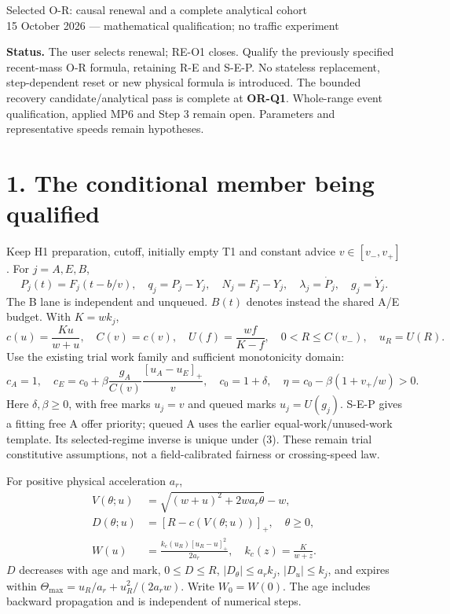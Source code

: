 \documentclass[11pt,a4paper]{article}
\newcommand{\pos}[1]{[#1]_+}
\begin{document}
\begin{center}
{\Large Selected O-R: causal renewal and a complete analytical cohort}\\[4pt]
15 October 2026 --- mathematical qualification; no traffic experiment
\end{center}

\textbf{Status.} The user selects renewal; RE-O1 closes. Qualify the
previously specified recent-mass O-R formula, retaining R-E and S-E-P.
No stateless replacement, step-dependent reset or new physical formula is
introduced. The bounded recovery candidate/analytical pass is complete at
\textbf{OR-Q1}. Whole-range event qualification, applied MP6 and Step 3
remain open. Parameters and representative speeds remain hypotheses.

\section*{1. The conditional member being qualified}

Keep H1 preparation, cutoff, initially empty T1 and constant advice
$v\in[v_-,v_+]$. For $j=A,E,B$,
\begin{equation}
 P_j(t)=F_j(t-b/v),\quad q_j=P_j-Y_j,\quad N_j=F_j-Y_j,
 \quad \lambda_j=\dot P_j,\quad g_j=\dot Y_j. \tag{1}
\end{equation}
The B lane is independent and unqueued. $B(t)$ denotes instead the
shared A/E budget. With $K=wk_j$,
\begin{equation}
 c(u)=\frac{Ku}{w+u},\quad C(v)=c(v),\quad U(f)=\frac{wf}{K-f},
 \quad 0<R\leq C(v_-),\quad u_R=U(R). \tag{2}
\end{equation}
Use the existing trial work family and sufficient monotonicity domain:
\begin{equation}
 c_A=1,\quad c_E=c_0+\beta\frac{g_A}{C(v)}\frac{\pos{u_A-u_E}}v,
 \quad c_0=1+\delta,\quad
 \eta=c_0-\beta(1+v_+/w)>0. \tag{3}
\end{equation}
Here $\delta,\beta\geq0$, with free marks $u_j=v$ and queued marks
$u_j=U(g_j)$. S-E-P gives a fitting free A offer priority; queued A
uses the earlier equal-work/unused-work template. Its selected-regime
inverse is unique under (3). These remain trial constitutive assumptions,
not a field-calibrated fairness or crossing-speed law.

For positive physical acceleration $a_r$,
\begin{align}
 V(\theta;u)&=\sqrt{(w+u)^2+2wa_r\theta}-w,\nonumber\\
 D(\theta;u)&=\pos{R-c(V(\theta;u))},\quad \theta\geq0,\nonumber\\
 W(u)&=\frac{k_c(u_R)\pos{u_R-u}^2}{2a_r},\quad
 k_c(z)=\frac K{w+z}. \tag{4}
\end{align}
$D$ decreases with age and mark, $0\leq D\leq R$,
$|D_\theta|\leq a_rk_j$, $|D_u|\leq k_j$, and expires within
$\Theta_{\max}=u_R/a_r+u_R^2/(2a_rw)$. Write $W_0=W(0)$.
The age includes backward propagation and is independent of numerical steps.
\end{document}
